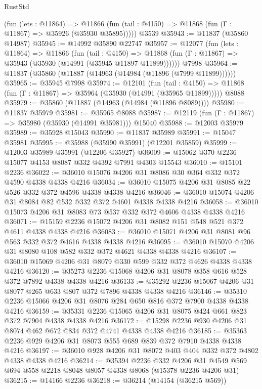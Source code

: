 \begin{lexlean}{RustStd}
\begin{coremodule}
      (fun (lets : @11864) =>
      @11866 (fun (tail : @4150) => @11868 (fun (Γ : @11867) => @35926 (@35930 @35895)))))
    @3539
@35943 := @11837 (@35860 @14987)
@35945 := @14992 @35890 @22747
@35957 := @12077
    (fun (lets : @11864) =>
    @11866
      (fun (tail : @4150) =>
      @11868 (fun (Γ : @11867) => @35943 (@35930 (@14991 (@35945 @11897 @11899))))))
    @7998
@35964 := @11837 (@35860 (@11887 (@14963 (@14984 (@11896 (@7999 @11899))))))
@35965 := @35945 @7998
@35974 := @12101
    (fun (tail : @4150) => @11868 (fun (Γ : @11867) => @35964 (@35930 (@14991 (@35965 @11899)))))
    @8088
@35979 := @35860 (@11887 (@14963 (@14984 (@11896 @8089))))
@35980 := @11837 @35979
@35981 := @35965 @8088
@35987 := @12119 (fun (Γ : @11867) => @35980 (@35930 (@14991 @35981))) @15040
@35988 := @12003 @35979
@35989 := @35928 @15043
@35990 := @11837 @35989
@35991 := @15047 @35981
@35995 := @35988 (@35990 @35991) (@12201 @35859)
@35999 := @12003 @35989 @35991 (@12206 @35927)
@36009 := @15062 @370 @2236 @15077 @4153 @8087 @332 @4392 @7991 @4303 @15543
@36010 := @15101 @2236
@36022 := @36010 @15076 @4206 @31 @8086 @30 @364 @332 @372 @4590 @4338 @4338 @4216
@36034 := @36010 @15075 @4206 @31 @8085 @22 @526 @332 @372 @4596 @4338 @4338 @4216
@36046 := @36010 @15074 @4206 @31 @8084 @82 @532 @332 @372 @4601 @4338 @4338 @4216
@36058 := @36010 @15073 @4206 @31 @8083 @73 @537 @332 @372 @4606 @4338 @4338 @4216
@36071 := @15159 @2236 @15072 @4206 @31 @8082 @151 @548 @521 @372 @4611 @4338 @4338 @4216
@36083 := @36010 @15071 @4206 @31 @8081 @96 @563 @332 @372 @4616 @4338 @4338 @4216
@36095 := @36010 @15070 @4206 @31 @8080 @108 @582 @332 @372 @4621 @4338 @4338 @4216
@36107 := @36010 @15069 @4206 @31 @8079 @330 @599 @332 @372 @4626 @4338 @4338 @4216
@36120 := @35273 @2236 @15068 @4206 @31 @8078 @358 @616 @528 @372 @7892 @4338 @4338 @4216
@36133 := @35292 @2236 @15067 @4206 @31 @8077 @265 @633 @807 @372 @7896 @4338 @4338 @4216
@36146 := @35310 @2236 @15066 @4206 @31 @8076 @284 @650 @816 @372 @7900 @4338 @4338 @4216
@36159 := @35331 @2236 @15065 @4206 @31 @8075 @424 @661 @823 @372 @7904 @4338 @4338 @4216
@36172 := @15298 @2236 @930 @4206 @31 @8074 @462 @672 @834 @372 @4741 @4338 @4338 @4216
@36185 := @35363 @2236 @929 @4206 @31 @8073 @555 @689 @839 @372 @7910 @4338 @4338 @4216
@36197 := @36010 @928 @4206 @31 @8072 @403 @404 @332 @372 @4802 @4338 @4338 @4216
@36214 := @35394
    @2236
    @332
    @4206
    @31
    @4549
    @569
    @694
    @558
    @2218
    @8048
    @8057
    @4338
    @8068
    (@15378 @2236 @4206 @31)
@36215 := @14166 @2236
@36218 := @36214 (@14154 (@36215 @569))

\end{coremodule}
\end{lexlean}
